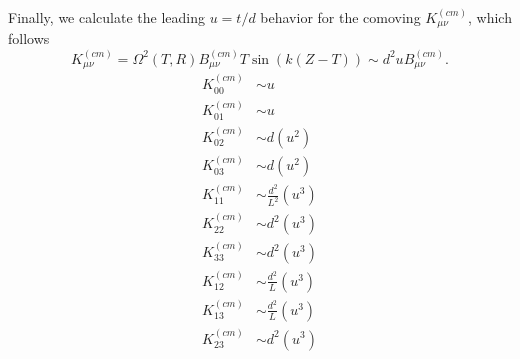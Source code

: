 \documentclass[10pt,letterpaper]{article}
\begin{document}
Finally, we calculate the leading $u= t/d$ behavior for the comoving $K_{\mu\nu}^{(cm)}$, which follows
\begin{equation}
K^{(cm)}_{\mu\nu} = \Omega^2(T,R)  B_{\mu\nu}^{(cm)} T \sin(k(Z-T)) \sim d^2 u B_{\mu\nu}^{(cm)}.
\end{equation}
\begin{align}
K^{(cm)}_{00} &\sim u \nonumber\\
K^{(cm)}_{01} &\sim u \nonumber\\
K^{(cm)}_{02} &\sim d(u^2) \nonumber\\
K^{(cm)}_{03} &\sim d(u^2) \nonumber\\
K^{(cm)}_{11} &\sim \frac{d^2}{L^2}(u^3) \nonumber\\
K^{(cm)}_{22} &\sim d^2(u^3) \nonumber\\
K^{(cm)}_{33} &\sim d^2(u^3) \nonumber\\
K^{(cm)}_{12} &\sim \frac{d^2}{L}(u^3) \nonumber\\
K^{(cm)}_{13} &\sim \frac{d^2}{L}(u^3) \nonumber\\
K^{(cm)}_{23} &\sim d^2(u^3)
\end{align}
\end{document}
